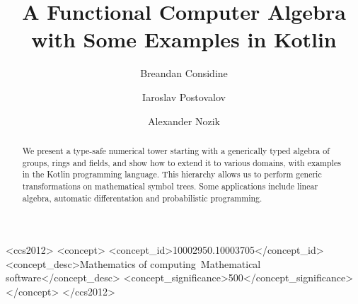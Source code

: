 \documentclass[sigconf]{acmart}
\begin{document}
\title{A Functional Computer Algebra\\with Some Examples in Kotlin}


\author{Breandan Considine}

\author{Iaroslav Postovalov}

\author{Alexander Nozik}


\begin{abstract}
We present a type-safe numerical tower starting with a generically typed algebra of groups, rings and fields, and show how to extend it to various domains, with examples in the Kotlin programming language. This hierarchy allows us to perform generic transformations on mathematical symbol trees. Some applications include linear algebra, automatic differentation and probabilistic programming.
\end{abstract}


\begin{CCSXML}
  <ccs2012>
  <concept>
  <concept_id>10002950.10003705</concept_id>
  <concept_desc>Mathematics of computing~Mathematical software</concept_desc>
  <concept_significance>500</concept_significance>
  </concept>
  </ccs2012>
\end{CCSXML}
\end{document}
